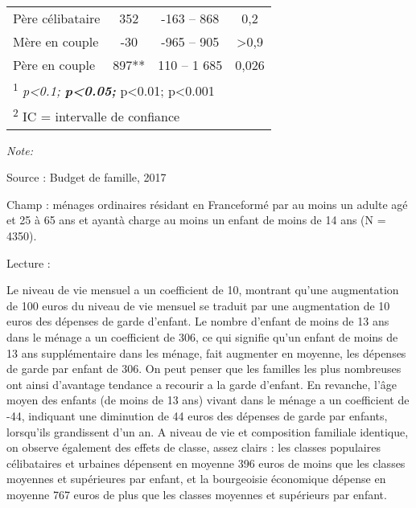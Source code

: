 \documentclass[
  12pt,
]{book}
\begin{document}
\begin{table}[!h]
{\begin{threeparttable}
\begin{tabular}[t]{lccc}
\addlinespace
\hspace{1em}Père célibataire & 352 & -163 – 868 & 0,2\\
\hspace{1em}Mère en couple & -30 & -965 – 905 & >0,9\\
\hspace{1em}Père en couple & 897** & 110 – 1 685 & 0,026\\
\bottomrule
\multicolumn{4}{l}{\rule{0pt}{1em}\textsuperscript{1} \textit{p<0.1; \textbf{p<0.05; }}p<0.01; \textbf{}p<0.001}\\
\multicolumn{4}{l}{\rule{0pt}{1em}\textsuperscript{2} IC = intervalle de confiance}\\
\end{tabular}
\begin{tablenotes}
\item \textit{Note: } 
\item Source : Budget de famille, 2017
\item Champ : ménages ordinaires résidant en Franceformé par au moins un adulte agé et 25 à 65 ans et ayantà charge au moins un enfant de moins de 14 ans (N = 4350).
\item Lecture : 
\end{tablenotes}
\end{threeparttable}}
\end{table}

Le niveau de vie mensuel a un coefficient de 10, montrant qu'une
augmentation de 100 euros du niveau de vie mensuel se traduit par une
augmentation de 10 euros des dépenses de garde d'enfant. Le nombre
d'enfant de moins de 13 ans dans le ménage a un coefficient de 306, ce
qui signifie qu'un enfant de moins de 13 ans supplémentaire dans les
ménage, fait augmenter en moyenne, les dépenses de garde par enfant de
306. On peut penser que les familles les plus nombreuses ont ainsi
d'avantage tendance a recourir a la garde d'enfant. En revanche, l'âge
moyen des enfants (de moins de 13 ans) vivant dans le ménage a un
coefficient de -44, indiquant une diminution de 44 euros des dépenses de
garde par enfants, lorsqu'ils grandissent d'un an. A niveau de vie et
composition familiale identique, on observe également des effets de
classe, assez clairs : les classes populaires célibataires et urbaines
dépensent en moyenne 396 euros de moins que les classes moyennes et
supérieures par enfant, et la bourgeoisie économique dépense en moyenne
767 euros de plus que les classes moyennes et supérieurs par enfant.
\end{document}
